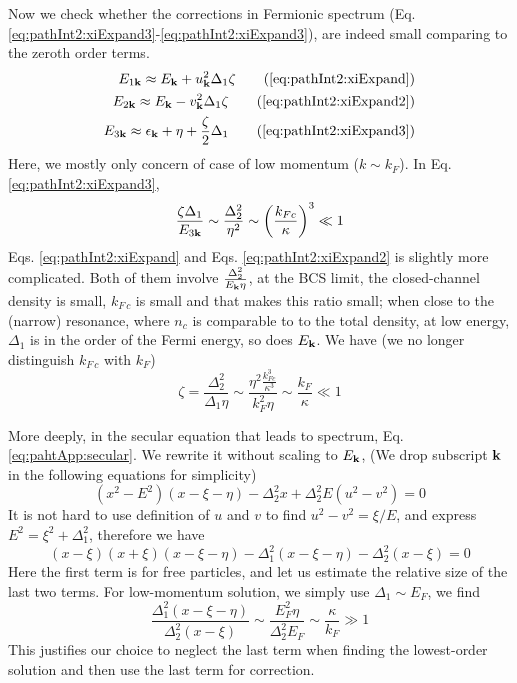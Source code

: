 Now we check whether the corrections in Fermionic spectrum (Eq. \ref{eq:pathInt2:xiExpand3}-\ref{eq:pathInt2:xiExpand3}), 
are indeed small comparing to the zeroth order terms.  
\begin{align}
E_{1\vk}\approx{}E_{\vk}+u_{\vk}^{2}\Delta_{1}\zeta\tag{\ref{eq:pathInt2:xiExpand}}\\
E_{2\vk}\approx{}E_{\vk}-v_{\vk}^{2}\Delta_{1}\zeta\tag{\ref{eq:pathInt2:xiExpand2}}\\
E_{3\vk}\approx{}\epsilon_{\vk}+\eta+\frac{\zeta}{2}\Delta_{1}
\tag{\ref{eq:pathInt2:xiExpand3}}
\end{align}
Here, we mostly only concern of case of low momentum ($k\sim{}k_{F}$).  In Eq. \ref{eq:pathInt2:xiExpand3}, 
\begin{equation*}
\frac{\zeta\Delta_{1}}{E_{3\mathbf{k}}}\sim{}\frac{\Delta_{2}^{2}}{\eta^{2}}\sim\left(\frac{k_{Fc}}{\kappa}\right)^{3}\ll1
\end{equation*}
Eqs. \ref{eq:pathInt2:xiExpand} and Eqs. \ref{eq:pathInt2:xiExpand2} is slightly more complicated.  Both of them involve $\frac{\Delta_{2}^{2}}{E_{\mathbf{k}}\eta}$,  at the  BCS limit, the closed-channel density is small, $k_{F\,c}$ is small and that makes this ratio small; when close to the (narrow) resonance, where $n_{c}$ is comparable to to the total density, at low energy, $\Delta_{1}$ is in the order of the Fermi energy, so does $E_{\mathbf{k}}$.   We have (we no longer distinguish $k_{F\,c}$ with $k_{F}$)
 \begin{equation}\label{eq:pathApp:zetaEs}
 \zeta=\frac{\Delta_{2}^{2}}{\Delta_{1}\eta}\sim\frac{\eta^{2}\frac{k_{Fc}^{3}}{\kappa^{3}}}{k_{F}^{2}\eta}\sim\frac{k_{F}}{\kappa}\ll1
\end{equation}

More deeply, in the secular equation that leads to spectrum, Eq. \ref{eq:pahtApp:secular}.  We rewrite it without scaling to $E_{\mathbf{k}}$,  (We drop subscript $\mathbf{k}$ in the following equations for simplicity)
\begin{equation*}
(x^{2}-E^{2})(x-\xi-\eta)-\Delta_{2}^{2}x+\Delta_{2}^{2}E(u^{2}-v^{2})=0
\end{equation*}
It is not hard to use definition of $u$ and $v$ to find $u^{2}-v^{2}=\xi/E$, and express $E^{2}=\xi^{2}+\Delta_{1}^{2}$, therefore we have
\begin{equation*}
(x-\xi)(x+\xi)(x-\xi-\eta)-\Delta_{1}^{2}(x-\xi-\eta)-\Delta_{2}^{2}(x-\xi)=0
\end{equation*}
Here the first term is for free particles, and let us estimate the relative size of the last two terms.  For low-momentum solution, we simply use $\Delta_{1}\sim{}E_{F}$, we find
\begin{equation*}
\frac{\Delta_{1}^{2}(x-\xi-\eta)}{\Delta_{2}^{2}(x-\xi)}\sim\frac{E_{F}^{2}\eta}{\Delta_{2}^{2}E_{F}}\sim\frac{\kappa}{k_{F}}\gg1
\end{equation*}
This justifies our choice to neglect the last term when finding the lowest-order solution and then use the last term for correction.  

